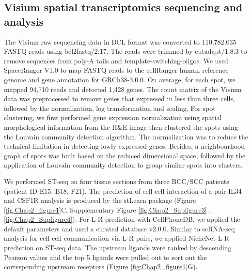 \subsection{Visium spatial transcriptomics sequencing and analysis}
The Visium raw sequencing data in BCL format was converted to 110,782,035 FASTQ reads using bcl2fastq/2.17. The reads were trimmed by cutadapt/1.8.3 to remove sequences from poly-A tails and template-switching-oligos. We used SpaceRanger V1.0 to map FASTQ reads to the cellRanger human reference genome and gene annotation for GRCh38-3.0.0. On average, for each spot, we mapped 94,710 reads and detected 1,428 genes. The count matrix of the Visium data was preprocessed to remove genes that expressed in less than three cells, followed by the normalization, log transformation and scaling. For spot clustering, we first performed gene expression normalization using spatial morphological information from the H\&E image then clustered the spots using the Louvain community detection algorithm. The normalization was to reduce the technical limitation in detecting lowly expressed genes. Besides, a neighbourhood graph of spots was built based on the reduced dimensional space, followed by the application of Louvain community detection to group similar spots into clusters. 

We performed ST-seq on four tissue sections from three BCC/SCC patients (patient ID-E15, B18, F21). The prediction of cell-cell interaction of a pair IL34 and CSF1R analysis is produced by the stLearn package \cite{pham2020stlearn} (Figure \ref{fig:Chap2_figure1}C, Supplementary Figure \ref{fig:Chap2_Supfigure3} , \ref{fig:Chap2_Supfigure4}).  For L-R prediction with CellPhoneDB, we applied the default parameters \cite{browaeys2020nichenet, efremova2020cellphonedb}  and used a curated database v2.0.0. Similar to scRNA-seq analysis for cell-cell communication via L-R pairs, we applied NicheNet L-R prediction on ST-seq data. The upstream ligands were ranked by descending Pearson values and the top 5 ligands were pulled out to sort out the corresponding upstream receptors (Figure \ref{fig:Chap2_figure1}G). 

